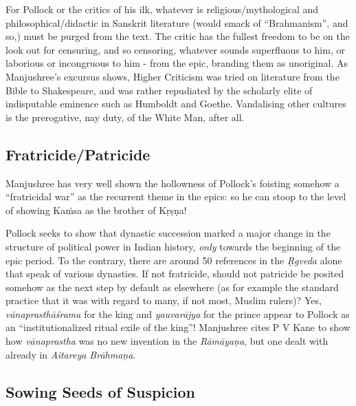 For Pollock or the critics of his ilk, whatever is religious/mythological and philosophical/didactic in Sanskrit literature (would smack of “Brahmanism”, and so,) must be purged from the text. The critic has the fullest freedom to be on the look out for censuring, and so censoring, whatever sounds superfluous to him, or laborious or incongruous to him - from the epic, branding them as unoriginal. As Manjushree's excursus shows, Higher Criticism was tried on literature from the Bible to Shakespeare, and was rather repudiated by the scholarly elite of indisputable eminence such as Humboldt and Goethe. Vandalising other cultures is the prerogative, nay duty, of the White Man, after all.\\[-20pt]

\subsection*{Fratricide/Patricide}

Manjushree has very well shown the hollowness of Pollock's foisting somehow a “fratricidal war” as the recurrent theme in the epics: so he can stoop to the level of showing Kaṁsa as the brother of Kṛṣṇa!

Pollock seeks to show that dynastic succession marked a major change in the structure of political power in Indian history, {\sl only} towards the beginning of the epic period. To the contrary, there are around 50 references in the {\sl Ṛgveda} alone that speak of various dynasties. If not fratricide, should not patricide be posited somehow as the next step by default as elsewhere (as for example the standard practice that it was with regard to many, if not most, Muslim rulers)? Yes, {\sl vānaprasthāśrama} for the king and {\sl yauvarājya} for the prince appear to Pollock as an “institutionalized ritual exile of the king”! Manjushree cites P V Kane to show how {\sl vānaprastha} was no new invention in the {\sl Rāmāyaṇa}, but one dealt with already in {\sl Aitareya Brāhmaṇa}.\\[-20pt]

\subsection*{Sowing Seeds of Suspicion}

